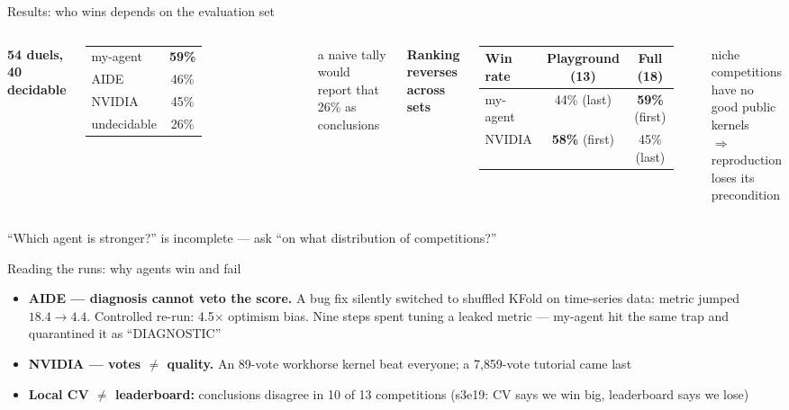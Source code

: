 \documentclass[aspectratio=169,11pt]{beamer}
\begin{document}
\begin{frame}{Results: who wins depends on the evaluation set}
  \begin{columns}[t]
      \centering
      \textbf{54 duels, 40 decidable}\\[1ex]
      \begin{tabular}{@{}lc@{}}
        \toprule
        my-agent & \alert{\textbf{59\%}} \\
        AIDE & 46\% \\
        NVIDIA & 45\% \\
        \midrule
        undecidable & \alert{26\%} \\
        \bottomrule
      \end{tabular}\\[1.2ex]
      \parbox{0.9\linewidth}{\centering\small a naive tally would report that 26\% as conclusions}
      \centering
      \textbf{Ranking reverses across sets}\\[1ex]
      \begin{tabular}{@{}lcc@{}}
        \toprule
        \textbf{Win rate} & \textbf{Playground (13)} & \textbf{Full (18)} \\
        \midrule
        my-agent & 44\% (last) & \textbf{59\%} (first) \\
        NVIDIA & \textbf{58\%} (first) & 45\% (last) \\
        \bottomrule
      \end{tabular}\\[1.2ex]
      \parbox{0.95\linewidth}{\centering\small niche competitions have no good public kernels\\$\Rightarrow$ reproduction loses its precondition}
  \end{columns}
  \vspace{2ex}
  \centering
  \alert{``Which agent is stronger?'' is incomplete --- ask ``on what distribution of competitions?''}
\end{frame}

\begin{frame}{Reading the runs: why agents win and fail}
  \begin{itemize}\itemsep=1.2ex
    \item \textbf{AIDE --- diagnosis cannot veto the score.} A bug fix silently switched to shuffled KFold on time-series data: metric jumped $18.4 \to 4.4$. Controlled re-run: \alert{4.5$\times$ optimism bias}. Nine steps spent tuning a leaked metric --- my-agent hit the same trap and quarantined it as ``DIAGNOSTIC''
    \item \textbf{NVIDIA --- votes $\neq$ quality.} An 89-vote workhorse kernel beat everyone; a 7{,}859-vote tutorial came last
    \item \textbf{Local CV $\neq$ leaderboard:} conclusions disagree in \alert{10 of 13} competitions (s3e19: CV says we win big, leaderboard says we lose)
  \end{itemize}
\end{frame}
\end{document}
